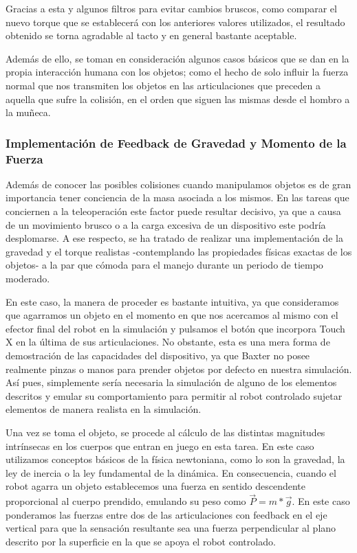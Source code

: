 Gracias a esta y algunos filtros para evitar cambios bruscos, como comparar el nuevo torque que se establecerá con los anteriores valores utilizados, el resultado obtenido se torna agradable al tacto y en general bastante aceptable. 

Además de ello, se toman en consideración algunos casos básicos que se dan en la propia interacción humana con los objetos; como el hecho de solo influir la fuerza normal que nos transmiten los objetos en las articulaciones que preceden a aquella que sufre la colisión,  en el orden que siguen las mismas desde el hombro a la muñeca.

\subsubsection{Implementación de Feedback de Gravedad y Momento de la Fuerza}

Además de conocer las posibles colisiones cuando manipulamos objetos es de gran importancia tener conciencia de la masa asociada a los mismos. En las tareas que conciernen a la teleoperación este factor puede resultar decisivo, ya que a causa de un movimiento brusco o a la carga excesiva de un dispositivo este podría desplomarse. A ese respecto, se ha tratado de realizar una implementación de la gravedad y el torque realistas -contemplando las propiedades físicas exactas de los objetos- a la par que cómoda para el manejo durante un periodo de tiempo moderado.

En este caso, la manera de proceder es bastante intuitiva, ya que consideramos que agarramos un objeto en el momento en que nos acercamos al mismo con el efector final del robot en la simulación y pulsamos el botón que incorpora Touch X en la última de sus articulaciones. No obstante, esta es una mera forma de demostración de las capacidades del dispositivo, ya que Baxter no posee realmente pinzas o manos para prender objetos por defecto en nuestra simulación. Así pues, simplemente sería necesaria la simulación de alguno de los elementos descritos y emular su comportamiento para permitir al robot controlado sujetar elementos de manera realista en la simulación.

Una vez se toma el objeto, se procede al cálculo de las distintas magnitudes intrínsecas en los cuerpos que entran en juego en esta tarea. En este caso utilizamos conceptos básicos de la física newtoniana, como lo son la gravedad, la ley de inercia o la ley fundamental de la dinámica. En consecuencia, cuando el robot agarra un objeto establecemos una fuerza en sentido descendente proporcional al cuerpo prendido, emulando su peso como $\overrightarrow P = m * \overrightarrow g$. En este caso ponderamos las fuerzas entre dos de las articulaciones con feedback en el eje vertical para que la sensación resultante sea una fuerza perpendicular al plano descrito por la superficie en la que se apoya el robot controlado.

